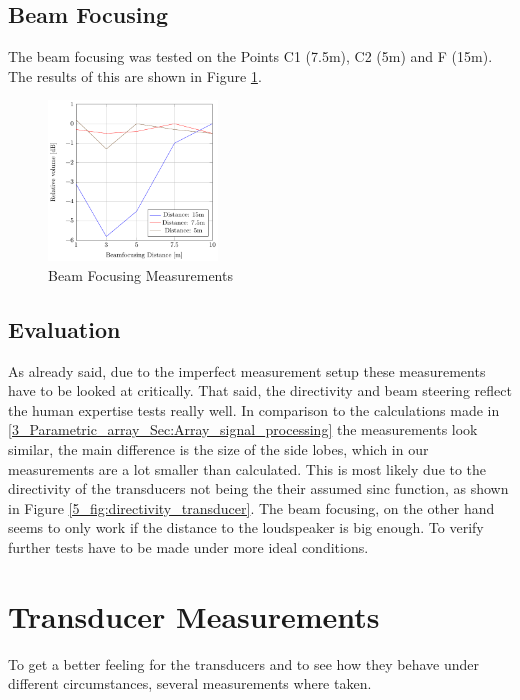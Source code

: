\subsection{Beam Focusing}
The beam focusing was tested on the Points C1 (7.5m), C2 (5m) and F (15m). The results of this are shown in Figure \ref{6_fig:beamforming_measurements}.
\begin{figure}[h!]
    \centering
    \includegraphics[width=0.4\textwidth]{images/6_Measurements/Beamfocusing.pdf}
    \caption{Beam Focusing Measurements}
    \label{6_fig:beamforming_measurements}
\end{figure}
\subsection{Evaluation}
As already said, due to the imperfect measurement setup these measurements have to be looked at critically. That said, the directivity and beam steering reflect the human expertise tests really well. In comparison to the calculations made in \ref{3_Parametric_array_Sec:Array_signal_processing} the measurements look similar, the main difference is the size of the side lobes, which in our measurements are a lot smaller than calculated. This is most likely due to the directivity of the transducers not being the their assumed sinc function, as shown in Figure \ref{5_fig:directivity_transducer}. 
The beam focusing, on the other hand seems to only work if the distance to the loudspeaker is big enough. To verify further tests have to be made under more ideal conditions. 
\newpage

\section{Transducer Measurements}
To get a better feeling for the transducers and to see how they behave under different circumstances, several measurements where taken. 
